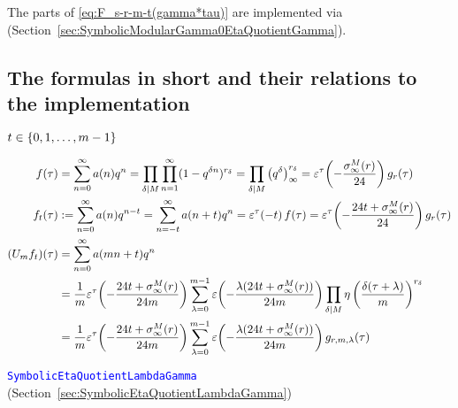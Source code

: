 \documentclass{article}
\begin{document}
The parts of \eqref{eq:F_s-r-m-t(gamma*tau)} are implemented via
\textcolor{blue}{}
(Section~\ref{sec:SymbolicModularGamma0EtaQuotientGamma}).












\subsection{The formulas in short and their relations to the
  implementation}
\label{sec:formulas-in-short}
$t \in \Set{0,1,\ldots,m-1}$

\begin{align*}
  f(\tau)
  &=
  \sum_{n=0}^\infty a(n) q^n
  =
  \divisorprod{M}\prod_{n=1}^\infty(1-q^{\delta n})^{r_\delta}
  =
  \divisorprod{M}\eulerFunction{\delta}^{r_\delta}
  =
  \unityPowerTau{-\frac{\sigmainfty[M]{r}}{24}} g_r(\tau)
  \\
  f_t(\tau)
  &:=
  \sum_{n=0}^\infty a(n) q^{n-t}
  =
  \sum_{n=-t}^\infty a(n+t) q^{n}
  =
  \unityPowerTau{-t}f(\tau)
  =
  \unityPowerTau{-\frac{24t+\sigmainfty[M]{r}}{24}} g_r(\tau)
  \\
  (U_mf_t)(\tau)
  &=
    \sum_{n=0}^\infty a(mn+t) q^n
  \\
  &=
  \frac{1}{m}
  \unityPowerTau{-\frac{24t+\sigmainfty[M]{r}}{24m}}
  \sum_{\lambda=0}^{m-1}
  \unityPower{-\frac{\lambda (24t+\sigmainfty[M]{r})}{24m}}
  \divisorprod{M}
    \eta\left(\frac{\delta(\tau+\lambda)}{m}\right)^{r_\delta}
  \\
  &=
    \frac{1}{m}
    \unityPowerTau{-\frac{24t+\sigmainfty[M]{r}}{24m}}
    \sum_{\lambda=0}^{m-1}
    \unityPower{-\frac{\lambda (24t+\sigmainfty[M]{r})}{24m}}
    g_{r,m,\lambda}(\tau)
\end{align*}

\textcolor{blue}{\texttt{SymbolicEtaQuotientLambdaGamma}}
(Section~\ref{sec:SymbolicEtaQuotientLambdaGamma})
\end{document}
